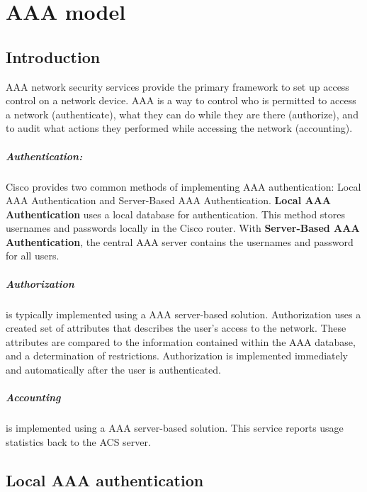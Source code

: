 \chapter{AAA model}

\section{Introduction}

AAA network security services provide the primary framework to set up access control on a network device. AAA is a way to control who is permitted to access a network (authenticate), what they can do while they are there (authorize), and to audit what actions they performed while accessing the network (accounting).

\paragraph{Authentication:} Cisco provides two common methods of implementing AAA authentication: Local AAA Authentication and Server-Based AAA Authentication. \textbf{Local AAA Authentication} uses a local database for authentication. This method stores usernames and passwords locally in the Cisco router. With \textbf{Server-Based AAA Authentication}, the central AAA server contains the usernames and password for all users.

\paragraph{Authorization} is typically implemented using a AAA server-based solution. Authorization uses a created set of attributes that describes the user’s access to the network. These attributes are compared to the information contained within the AAA database, and a determination of restrictions. Authorization is implemented immediately and automatically after the user is authenticated.

\paragraph{Accounting} is implemented using a AAA server-based solution. This service reports usage statistics back to the ACS server. 

\section{Local AAA authentication}

